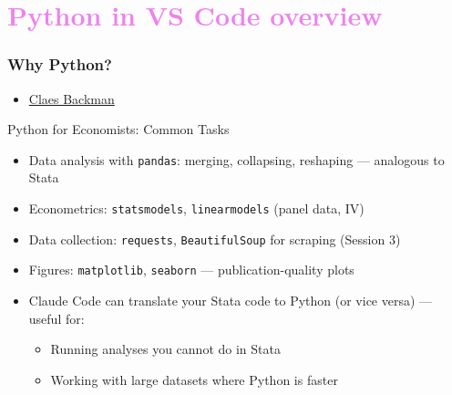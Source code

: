 \documentclass[aspectratio=169, 12pt]{beamer}
\begin{document}
\section{\textcolor{violet}{Python in VS Code overview \vspace{0.3in}}}

\begin{frame}
\frametitle{Why Python?}


\begin{itemize}
    \item \href{https://claesbackman.com/claude-code-guide.html\#:~:text=of\%20Economics.-,Python,-ms\%2Dpython.python}{Claes Backman}
\end{itemize}
Python for Economists: Common Tasks

\begin{itemize}
    \item Data analysis with \texttt{pandas}: merging, collapsing, reshaping --- analogous to Stata
    \item Econometrics: \texttt{statsmodels}, \texttt{linearmodels} (panel data, IV)
    \item Data collection: \texttt{requests}, \texttt{BeautifulSoup} for scraping (Session 3)
    \item Figures: \texttt{matplotlib}, \texttt{seaborn} --- publication-quality plots
    \vspace{.05in}
    \item Claude Code can translate your Stata code to Python (or vice versa) --- useful for:
        \begin{itemize}
            \item[$\circ$] Running analyses you cannot do in Stata
            \item[$\circ$] Working with large datasets where Python is faster
        \end{itemize}
\end{itemize}
\end{frame}
\end{document}
